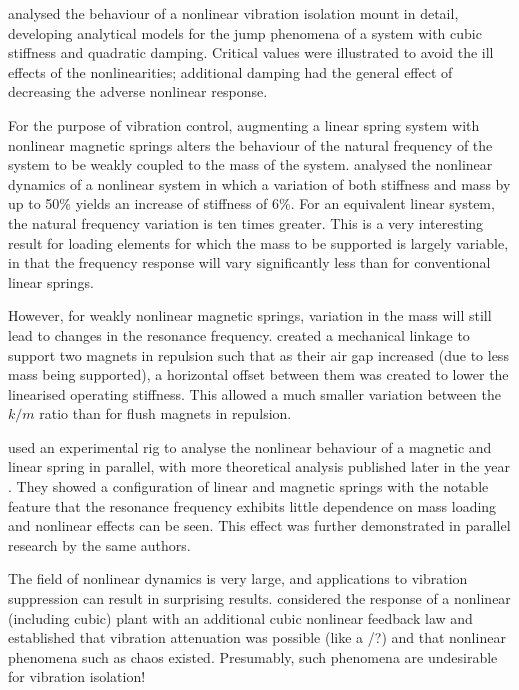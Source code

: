 \textcite{jazar2006} analysed the behaviour of a nonlinear vibration isolation mount in detail, developing analytical models for the jump phenomena of a system with cubic stiffness and quadratic damping.
Critical values were illustrated to avoid the ill effects of the nonlinearities; additional damping had the general effect of decreasing the adverse nonlinear response.

For the purpose of vibration control, augmenting a linear spring system with nonlinear magnetic springs alters the behaviour of the natural frequency of the system to be weakly coupled to the mass of the system.
\textcite{dangola2006} analysed the nonlinear dynamics of a nonlinear system in which a variation of both stiffness and mass by up to 50\% yields an increase of stiffness of 6\%.
For an equivalent linear system, the natural frequency variation is ten times greater.
This is a very interesting result for loading elements for which the mass to be supported is largely variable, in that the frequency response will vary significantly less than for conventional linear springs.

However, for weakly nonlinear magnetic springs, variation in the mass will
still lead to changes in the resonance frequency.
\textcite{todaka2001}
created a mechanical linkage to support two magnets in repulsion such that as
their air gap increased (due to less mass being supported), a horizontal
offset between them was created to lower the linearised operating stiffness.
This allowed a much smaller variation between the $k/m$ ratio than for flush
magnets in repulsion.

\textcite{bonisoli2007} used an experimental rig to analyse the nonlinear
behaviour of a magnetic and linear spring in parallel, with more theoretical
analysis published later in the year \cite{bonisoli2007b}.
They showed a
configuration of linear and magnetic springs with the notable feature that the
resonance frequency exhibits little dependence on mass loading and nonlinear
effects can be seen.
This effect was further demonstrated in parallel research
by the same authors.

The field of nonlinear dynamics is very large, and applications to vibration
suppression can result in surprising results.
\textcite{oueini1999} considered
the response of a nonlinear (including cubic) plant with an additional cubic
nonlinear feedback law and established that vibration attenuation was possible
(like a \vibneut/?) and that nonlinear phenomena such as chaos existed.
Presumably, such phenomena are undesirable for vibration isolation!


